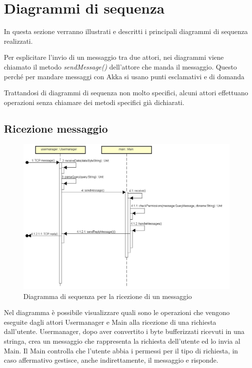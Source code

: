 \documentclass[a4paper]{article}
\begin{document}
	\section{Diagrammi di sequenza}
	In questa sezione verranno illustrati e descritti i principali diagrammi di sequenza realizzati. 
        
        Per esplicitare l'invio di un messaggio tra due attori, nei diagrammi viene chiamato il metodo \textit{sendMessage()} dell'attore che manda il messaggio. Questo perché per mandare messaggi con Akka si usano punti esclamativi e di domanda
        
        Trattandosi di diagrammi di sequenza non molto specifici, alcuni attori effettuano operazioni senza chiamare dei metodi specifici già 
        dichiarati. 
        
       \subsection{Ricezione messaggio}
	\begin{figure}[H]
			\centering
			\includegraphics[width=\textwidth]{Sequenza/seqComandoUtente.jpg}
			\caption{Diagramma di sequenza per la ricezione di un messaggio}
		\end{figure}
		Nel diagramma è possibile visualizzare quali sono le operazioni che vengono eseguite dagli
attori Usermanager e Main alla ricezione di una richiesta dall'utente. Usermanager, dopo aver convertito
i byte bufferizzati ricevuti in una stringa, crea un messaggio che rappresenta la richiesta dell'utente ed lo invia al
Main. Il Main controlla che l'utente abbia i permessi per il tipo di richiesta, in caso affermativo gestisce,
anche indirettamente, il messaggio e risponde.
\end{document}
